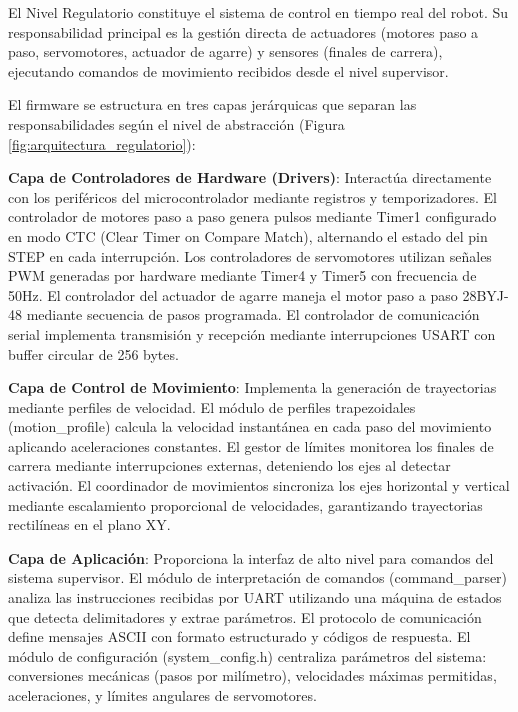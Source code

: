 El Nivel Regulatorio constituye el sistema de control en tiempo real del robot. Su responsabilidad principal es la gestión directa de actuadores (motores paso a paso, servomotores, actuador de agarre) y sensores (finales de carrera), ejecutando comandos de movimiento recibidos desde el nivel supervisor.

El firmware se estructura en tres capas jerárquicas que separan las responsabilidades según el nivel de abstracción (Figura \ref{fig:arquitectura_regulatorio}):

\textbf{Capa de Controladores de Hardware (Drivers)}: Interactúa directamente con los periféricos del microcontrolador mediante registros y temporizadores. El controlador de motores paso a paso genera pulsos mediante Timer1 configurado en modo CTC (Clear Timer on Compare Match), alternando el estado del pin STEP en cada interrupción. Los controladores de servomotores utilizan señales PWM generadas por hardware mediante Timer4 y Timer5 con frecuencia de 50Hz. El controlador del actuador de agarre maneja el motor paso a paso 28BYJ-48 mediante secuencia de pasos programada. El controlador de comunicación serial implementa transmisión y recepción mediante interrupciones USART con buffer circular de 256 bytes.

\textbf{Capa de Control de Movimiento}: Implementa la generación de trayectorias mediante perfiles de velocidad. El módulo de perfiles trapezoidales (motion\_profile) calcula la velocidad instantánea en cada paso del movimiento aplicando aceleraciones constantes. El gestor de límites monitorea los finales de carrera mediante interrupciones externas, deteniendo los ejes al detectar activación. El coordinador de movimientos sincroniza los ejes horizontal y vertical mediante escalamiento proporcional de velocidades, garantizando trayectorias rectilíneas en el plano XY.

\textbf{Capa de Aplicación}: Proporciona la interfaz de alto nivel para comandos del sistema supervisor. El módulo de interpretación de comandos (command\_parser) analiza las instrucciones recibidas por UART utilizando una máquina de estados que detecta delimitadores y extrae parámetros. El protocolo de comunicación define mensajes ASCII con formato estructurado y códigos de respuesta. El módulo de configuración (system\_config.h) centraliza parámetros del sistema: conversiones mecánicas (pasos por milímetro), velocidades máximas permitidas, aceleraciones, y límites angulares de servomotores.

